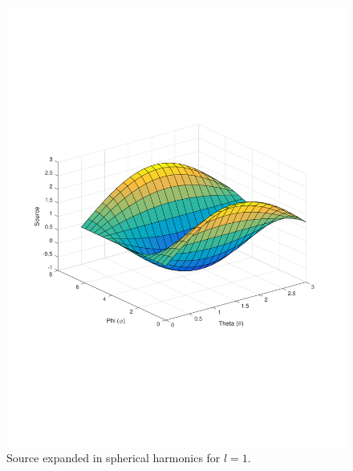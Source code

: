 \documentclass[10pt]{article}
\begin{document}
\begin{figure}[H]
  \centering
  \includegraphics[width=15cm]{l_1.pdf}
  \caption{Source expanded in spherical harmonics for \(l=1\).}
  \label{fig:one}
\end{figure}
\end{document}
